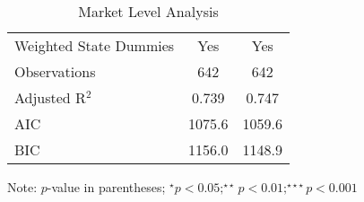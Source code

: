 \begin{table}[]
\begin{threeparttable}[t]
\begin{tabular}{@{}lcc@{}}
Weighted State Dummies                       & Yes                   & Yes                   \\
Observations                                 & 642                   & 642                   \\
Adjusted R$^2$                                  & 0.739                 & 0.747                 \\
AIC                                          & 1075.6                & 1059.6                \\
BIC                                          & 1156.0                & 1148.9                \\ \bottomrule
\end{tabular}%
\begin{tablenotes}
\item Note: $p$-value in parentheses; $^\star p<0.05;^{\star\star} p<0.01;^{\star\star\star} p<0.001 $
\end{tablenotes}
\caption{Market Level Analysis}
\end{threeparttable}
\label{reg_mkt_simplified}
\end{table} 